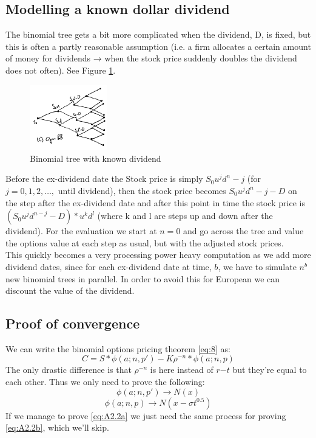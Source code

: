 \documentclass{article}
\begin{document}
\subsection{Modelling a known dollar dividend}
The binomial tree gets a bit more complicated when the dividend, D, is fixed, but this is often a partly reasonable assumption (i.e. a firm allocates a certain amount of money for dividends → when the stock price suddenly doubles the dividend does not often). See Figure \ref{fig:divtree}.\\
\begin{figure}
\centering
\includegraphics[width=0.3\textwidth]{five-step-tree-w-dividend.png}
\caption{\label{fig:divtree} Binomial tree with known dividend}
\end{figure}
Before the ex-dividend date the Stock price is simply $S_0 u^j d^n - j$ (for $j = 0, 1, 2, …,$ until dividend), then the stock price becomes $S_0 u^j d^n - j - D$ on the step after the ex-dividend date and after this point in time the stock price is $(S_0 u^j d^{n - j} - D) * u^k d^l$ (where k and l are steps up and down after the dividend). For the evaluation we start at $n = 0$ and go across the tree and value the options value at each step as usual, but with the adjusted stock prices.\\This quickly becomes a very processing power heavy computation as we add more dividend dates, since for each ex-dividend date at time, $b$, we have to simulate $n^b$ new binomial trees in parallel. In order to avoid this for European we can discount the value of the dividend.

\subsection{Proof of convergence}
We can write the binomial options pricing theorem \ref{eq:8} as:
\begin{equation}\label{eq:A2.1}
    C = S *\phi(a; n, p') - K \rho^{-n} * \phi(a; n, p)
\end{equation}
The only drastic difference is that $\rho^{-n}$ is here instead of $r{-t}$ but they’re equal to each other. Thus we only need to prove the following:
\begin{equation}\label{eq:A2.2a}
    \phi(a; n, p') \to N(x)
\end{equation}
\begin{equation}\label{eq:A2.2b}
    \phi(a; n, p) \to N(x - \sigma t^{0.5})
\end{equation}
If we manage to prove \ref{eq:A2.2a} we just need the same process for proving \ref{eq:A2.2b}, which we’ll skip.
\end{document}
